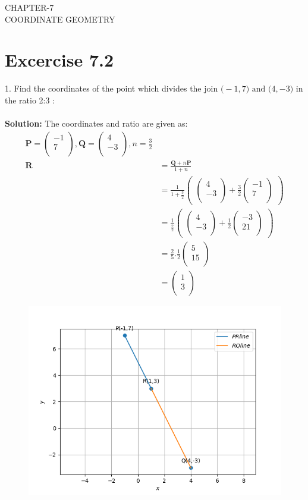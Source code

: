 \documentclass[12pt]{article}
\newcommand{\solution}{\noindent \textbf{Solution: }}
\newcommand{\myvec}[1]{\ensuremath{\begin{pmatrix}#1\end{pmatrix}}}
\let\vec\mathbf
\begin{document}
\begin{center}
\textbf\large{CHAPTER-7 \\ COORDINATE GEOMETRY}
\end{center}
\section*{Excercise 7.2}

1. Find the coordinates of the point which divides the join $\vec(-1,7) \text{ and } \vec(4,-3)$ in the ratio 2:3 :
\\
\\
\solution		
The coordinates and ratio are given as:
\begin{align}
\vec{P}=\myvec{-1\\7\\},
\vec{Q}=\myvec{4\\-3\\},
n=\frac{3}{2}\\
\vec{R}&=\frac{\vec{Q}+n\vec{P}}{1+n}\\
&=\frac{1}{1+\frac{3}{2}}  \myvec{\myvec{
4\\
-3\\
}
  +
   \frac{3}{2}\myvec{
-1\\
7\\
}}\\
&= \frac{1}{\frac{5}{2}} \myvec{\myvec{
4\\
-3\\
}
  +
\frac{1}{2}\myvec{
-3\\
21\\
}} \\
&=\frac{2}{5}.\frac{1}{2}
\myvec{
5\\
15\\
}\\
&=\myvec{
1\\
3\\
}
\end{align}


\begin{figure}[!h]
\begin{center}
   \includegraphics[width=\columnwidth]{./figs/linefig.png}
\end{center}
\caption{}
\label{fig:Fig}
\end{figure}
\end{document}
